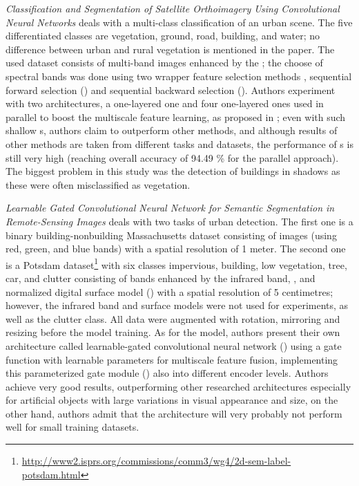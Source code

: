 \textit{Classification and Segmentation of Satellite Orthoimagery Using Convolutional Neural Networks} deals with a multi-class classification of an urban scene. The five differentiated classes are vegetation, ground, road, building, and water; no difference between urban and rural vegetation is mentioned in the paper. The used dataset consists of multi-band images enhanced by the ; the choose of spectral bands was done using two wrapper feature selection methods \cite{wrapper-feature-selection}, sequential forward selection () and sequential backward selection (). Authors experiment with two  architectures, a one-layered one and four one-layered ones used in parallel to boost the multiscale feature learning, as proposed in \cite{multiscale-parallel-cnn}; even with such shallow s, authors claim to outperform other  methods, and although results of other methods are taken from different tasks and datasets, the performance of s is still very high (reaching overall accuracy of 94.49 \% for the parallel approach). The biggest problem in this study was the detection of buildings in shadows as these were often misclassified as vegetation.

\textit{Learnable Gated Convolutional Neural Network for Semantic Segmentation in Remote-Sensing Images} deals with two tasks of urban detection. The first one is a binary building-nonbuilding Massachusetts dataset \cite{massachusetts-dataset} consisting of  images (using red, green, and blue bands) with a spatial resolution of 1 meter. The second one is a Potsdam dataset\footnote{\url{http://www2.isprs.org/commissions/comm3/wg4/2d-sem-label-potsdam.html}} with six classes impervious, building, low vegetation, tree, car, and clutter consisting of  bands enhanced by the infrared band, , and normalized digital surface model () with a spatial resolution of 5 centimetres; however, the infrared band and surface models were not used for experiments, as well as the clutter class. All data were augmented with rotation, mirroring and resizing before the model training. As for the model, authors present their own architecture called learnable-gated convolutional neural network () using a gate function with learnable parameters for multiscale feature fusion, implementing this parameterized gate module () also into different encoder levels. Authors achieve very good results, outperforming other researched architectures especially for artificial objects with large variations in visual appearance and size, on the other hand, authors admit that the architecture will very probably not perform well for small training datasets.

